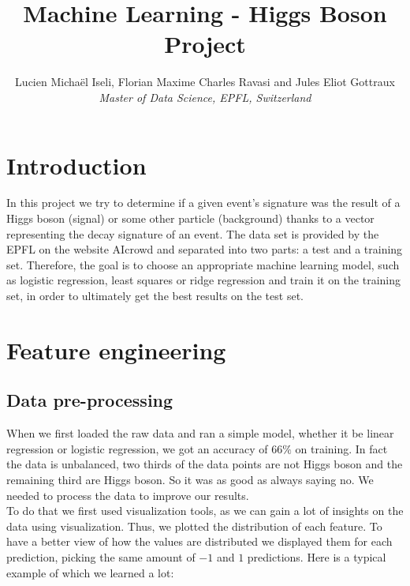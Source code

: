 \documentclass[10pt,conference,compsocconf]{IEEEtran}
\begin{document}
\title{Machine Learning - Higgs Boson Project}

\author{
  Lucien Michaël Iseli, Florian Maxime Charles Ravasi and Jules Eliot Gottraux\\
  \textit{Master of Data Science, EPFL, Switzerland}
}

\maketitle

\section{Introduction}
In this project we try to determine if a given event's signature was the result of a Higgs boson (signal) or some other particle (background) thanks to a vector representing the decay signature of an event. The data set is provided by the EPFL on the website AIcrowd and separated into two parts: a test and a training set. Therefore, the goal is to choose an appropriate machine learning model, such as logistic regression, least squares or ridge regression and train it on the training set, in order to ultimately get the best results on the test set.

\section{Feature engineering}
\label{sec:feature-engineering}
\subsection{Data pre-processing}
When we first loaded the raw data and ran a simple model, whether it be linear regression or logistic regression, we got an accuracy of $66\%$ on training. In fact the data is unbalanced, two thirds of the data points are not Higgs boson and the remaining third are Higgs boson. So it was as good as always saying no. We needed to process the data to improve our results. \\

To do that we first used visualization tools, as we can gain a lot of insights on the data using visualization. Thus, we plotted the distribution of each feature. To have a better view of how the values are distributed we displayed them for each prediction, picking the same amount of $-1$ and $1$ predictions. Here is a typical example of which we learned a lot:
\end{document}
